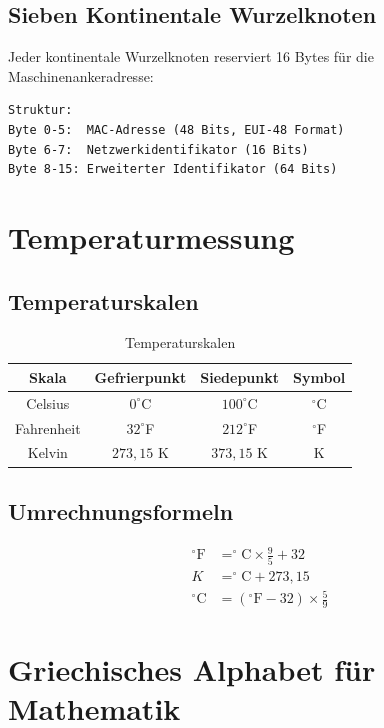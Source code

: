 \documentclass[12pt]{book}
\begin{document}
\section{Sieben Kontinentale Wurzelknoten}

Jeder kontinentale Wurzelknoten reserviert 16 Bytes für die Maschinenankeradresse:

\begin{verbatim}
Struktur:
Byte 0-5:  MAC-Adresse (48 Bits, EUI-48 Format)
Byte 6-7:  Netzwerkidentifikator (16 Bits)
Byte 8-15: Erweiterter Identifikator (64 Bits)
\end{verbatim}

\chapter{Temperaturmessung}

\section{Temperaturskalen}

\begin{table}[h]
\centering
\begin{tabular}{|c|c|c|c|}
\hline
\textbf{Skala} & \textbf{Gefrierpunkt} & \textbf{Siedepunkt} & \textbf{Symbol} \\
\hline
Celsius & $0^{\circ}$C & $100^{\circ}$C & $^{\circ}$C \\
\hline
Fahrenheit & $32^{\circ}$F & $212^{\circ}$F & $^{\circ}$F \\
\hline
Kelvin & $273{,}15$ K & $373{,}15$ K & K \\
\hline
\end{tabular}
\caption{Temperaturskalen}
\end{table}

\section{Umrechnungsformeln}

\begin{align}
^{\circ}\text{F} &= ^{\circ}\text{C} \times \frac{9}{5} + 32 \\
K &= ^{\circ}\text{C} + 273{,}15 \\
^{\circ}\text{C} &= (^{\circ}\text{F} - 32) \times \frac{5}{9}
\end{align}

\chapter{Griechisches Alphabet für Mathematik}
\end{document}
